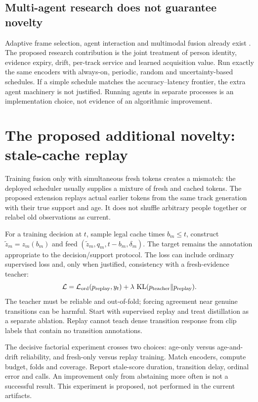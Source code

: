 \documentclass[10pt,a4paper]{article}
\begin{document}
\subsection{Multi-agent research does not guarantee novelty}
Adaptive frame selection, agent interaction and multimodal fusion already exist \cite{adaframe,edf}. The proposed research contribution is the joint treatment of person identity, evidence expiry, drift, per-track service and learned acquisition value. Run exactly the same encoders with always-on, periodic, random and uncertainty-based schedules. If a simple schedule matches the accuracy--latency frontier, the extra agent machinery is not justified. Running agents in separate processes is an implementation choice, not evidence of an algorithmic improvement.

\section{The proposed additional novelty: stale-cache replay}
Training fusion only with simultaneous fresh tokens creates a mismatch: the deployed scheduler usually supplies a mixture of fresh and cached tokens. The proposed extension replays actual earlier tokens from the same track generation with their true support and age. It does not shuffle arbitrary people together or relabel old observations as current.

For a training decision at $t$, sample legal cache times $b_m\leq t$, construct $\tilde z_m=z_m(b_m)$ and feed $(\tilde z_m,q_m,t-b_m,\delta_m)$. The target remains the annotation appropriate to the decision/support protocol. The loss can include ordinary supervised loss and, only when justified, consistency with a fresh-evidence teacher:
\begin{equation}
\mathcal L=\mathcal L_{\rm ord}(p_{\rm replay},y_t)
+\lambda\,\operatorname{KL}(p_{\rm teacher}\Vert p_{\rm replay}).
\end{equation}
The teacher must be reliable and out-of-fold; forcing agreement near genuine transitions can be harmful. Start with supervised replay and treat distillation as a separate ablation. Replay cannot teach dense transition response from clip labels that contain no transition annotations.

The decisive factorial experiment crosses two choices: age-only versus age-and-drift reliability, and fresh-only versus replay training. Match encoders, compute budget, folds and coverage. Report stale-score duration, transition delay, ordinal error and calls. An improvement only from abstaining more often is not a successful result. This experiment is proposed, not performed in the current artifacts.
\end{document}
